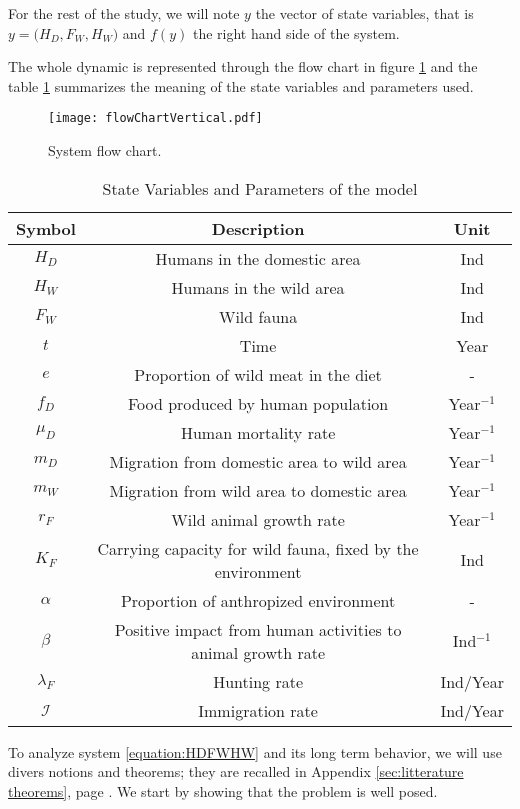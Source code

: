 \documentclass{article}
\newcommand{\lfw}{\lambda_{F}}
\newcommand{\lfw}{\lambda_{F}}
\theoremstyle{definition}
\theoremstyle{remark}
\begin{document}
For the rest of the study, we will note $y$ the vector of state variables, that is $y = \Big(H_D, F_W, H_W \Big)$ and $f(y)$ the right hand side of the system.

The whole dynamic is represented through the flow chart in figure \ref{fig:flow chart} and the table \ref{table:symbol} summarizes the meaning of the state variables and parameters used.

\begin{figure}[!ht]
\centering
\texttt{[image: flowChartVertical.pdf]}
\caption{System flow chart.}
\label{fig:flow chart}
\end{figure}


\begin{table}[ht]
\center
\begin{tabular}{|c|c|c|}
\hline 
Symbol & Description & Unit \\ 
\hline \hline
$H_D$ & Humans in the domestic area & Ind \\
$H_W$ & Humans in the wild area & Ind \\
$F_W$ & Wild fauna & Ind \\
\hline \hline
$t$ & Time & Year \\
$e$ & Proportion of wild meat in the diet & - \\
$f_D$ & Food produced by human population & Year$^{-1}$ \\
$\mu_D$ & Human mortality rate  & Year$^{-1}$ \\
$m_D$ & Migration from domestic area to wild area & Year$^{-1}$ \\
$m_W$ & Migration from wild area to domestic area & Year$^{-1}$ \\
$r_F$ & Wild animal growth rate & Year$^{-1}$ \\
$K_F$ & Carrying capacity for wild fauna, fixed by the environment& Ind \\
$\alpha$ & Proportion of anthropized environment & - \\
$\beta$ & Positive impact from human activities to animal growth rate & Ind$^{-1}$  \\
$\lfw$ & Hunting rate & Ind/Year\\
$\mathcal{I}$ & Immigration rate &Ind/Year\\
\hline
\end{tabular}
\caption{State Variables and Parameters of the model}
\label{table:symbol}
\end{table}

To analyze system \eqref{equation:HDFWHW} and its long term behavior, we will use divers notions and theorems; they are recalled in Appendix \ref{sec:litterature theorems}, page \pageref{sec:litterature theorems}. We start by showing that the problem is well posed.
\end{document}
